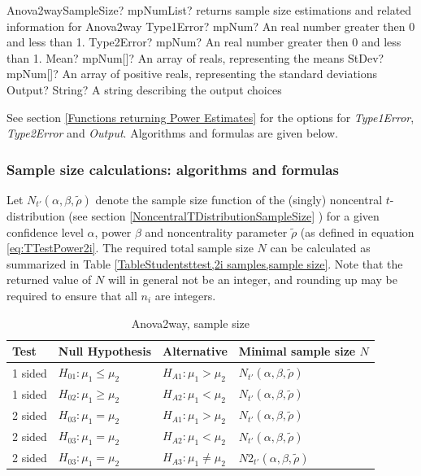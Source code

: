\begin{mpFunctionsExtract}
	\mpFunctionFiveNotImplemented
	{Anova2waySampleSize? mpNumList? returns sample size estimations and related information for Anova2way}
	{Type1Error? mpNum? An real number greater then 0 and less than 1.}
	{Type2Error? mpNum? An real number greater then 0 and less than 1.}
	{Mean? mpNum[]? An array of reals, representing the means}
	{StDev? mpNum[]? An array of positive reals, representing the standard deviations}
	{Output? String? A string describing the output choices}
\end{mpFunctionsExtract}

\vspace{0.3cm}
See section \ref{Functions returning Power Estimates} for the options for {\itshape\sffamily Type1Error},  {\itshape\sffamily Type2Error} and {\itshape\sffamily Output}. Algorithms and formulas are given below.

\subsubsection{Sample size calculations: algorithms and formulas}
Let $N_{t'}\left(\alpha, \beta, \widetilde{\rho} \right)$ denote the sample size function of the (singly) noncentral $t$-distribution (see section \ref{NoncentralTDistributionSampleSize} ) for a given confidence level $\alpha$, power $\beta$ and noncentrality parameter $\widetilde{\rho}$ (as defined in equation \ref{eq:TTestPower2i}. The required total sample size $N$ can be calculated as summarized in Table \ref{TableStudentsttest,2i samples,sample size}. Note that the returned value of $N$ will in general not be an integer, and rounding up may be required to ensure that all $n_i$ are integers.


\begin{table}[ht]
	\centering
	\begin{tabular}{|l|l|l|l|}
		\hline
		Test &Null Hypothesis &Alternative & Minimal sample size $N$ \\
		\hline
		1 sided & $H_{01}: \mu_1 \leq \mu_2$ & $H_{A1}: \mu_1 > \mu_2$ & $N_{t'}\left(\alpha, \beta, \widetilde{\rho} \right)$ \\
		1 sided & $H_{02}: \mu_1 \geq \mu_2$ & $H_{A2}: \mu_1 < \mu_2$ & $N_{t'}\left(\alpha, \beta, \widetilde{\rho} \right)$  \\
		\hline
		2 sided & $H_{03}: \mu_1 = \mu_2$ & $H_{A1}: \mu_1 > \mu_2$ & $N_{t'}\left(\alpha, \beta, \widetilde{\rho} \right)$ \\
		2 sided & $H_{03}: \mu_1 = \mu_2$ & $H_{A2}: \mu_1 < \mu_2$ & $N_{t'}\left(\alpha, \beta, \widetilde{\rho} \right)$  \\
		2 sided & $H_{03}: \mu_1 = \mu_2$ & $H_{A3}: \mu_1 \neq \mu_2$ & $N2_{t'}\left(\alpha, \beta, \widetilde{\rho} \right)$ \\
		\hline
	\end{tabular}
	\caption{Anova2way, sample size}
	\label{TableAnova2way,sample size}
\end{table}




